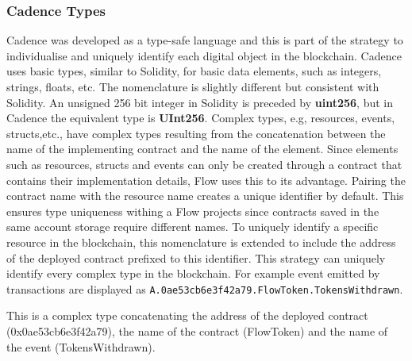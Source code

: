 \documentclass[../NFTComp_IEEE.tex]{subfiles}
\begin{document}
\subsubsection{Cadence Types}
Cadence was developed as a type-safe language and this is part of the strategy to individualise and uniquely identify each digital object in the blockchain. Cadence uses basic types, similar to Solidity, for basic data elements, such as integers, strings, floats, etc. The nomenclature is slightly different but consistent with Solidity. An unsigned 256 bit integer in Solidity is preceded by \textbf{uint256}, but in Cadence the equivalent type is \textbf{UInt256}. Complex types, e.g, resources, events, structs,etc., have complex types resulting from the concatenation between the name of the implementing contract and the name of the element. Since elements such as resources, structs and events can only be created through a contract that contains their implementation details, Flow uses this to its advantage. Pairing the contract name with the resource name creates a unique identifier by default. This ensures type uniqueness withing a Flow projects since contracts saved in the same account storage require different names. To uniquely identify a specific resource in the blockchain, this nomenclature is extended to include the address of the deployed contract prefixed to this identifier. This strategy can uniquely identify every complex type in the blockchain. For example event emitted by transactions are displayed as \verb|A.0ae53cb6e3f42a79.FlowToken.TokensWithdrawn|.
\par
This is a complex type concatenating the address of the deployed contract (0x0ae53cb6e3f42a79), the name of the contract (FlowToken) and the name of the event (TokensWithdrawn).
\end{document}
